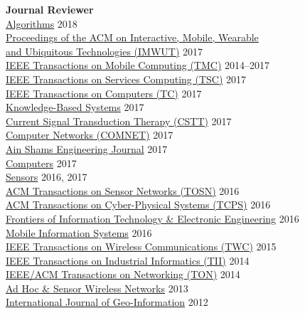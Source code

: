{\bf Journal Reviewer}\\
{\href{http://www.mdpi.com/journal/algorithms}{Algorithms}} \hfill 2018\\
{\href{https://imwut.acm.org}{Proceedings of the ACM on Interactive, Mobile, Wearable \\\mbox{\hspace{0.4cm}} and Ubiquitous Technologies (IMWUT)}} \hfill 2017\\
{\href{https://www.computer.org/portal/web/tmc}{IEEE Transactions on Mobile Computing (TMC)}} \hfill 2014--2017\\
{\href{https://www.computer.org/web/tsc}{IEEE Transactions on Services Computing (TSC)}} \hfill 2017\\
{\href{https://www.computer.org/web/tc}{IEEE Transactions on Computers (TC)}} \hfill 2017\\
{\href{https://www.journals.elsevier.com/knowledge-based-systems}{Knowledge-Based Systems}} \hfill 2017\\
{\href{http://benthamscience.com/journals/current-signal-transduction-therapy/}{Current Signal Transduction Therapy (CSTT)}} \hfill 2017\\
{\href{http://ees.elsevier.com/comnet/}{Computer Networks (COMNET)}} \hfill 2017\\
{\href{https://www.journals.elsevier.com/ain-shams-engineering-journal}{Ain Shams Engineering Journal}} \hfill 2017\\
{\href{http://www.mdpi.com/journal/computers}{Computers}} \hfill 2017\\
{\href{http://www.mdpi.com/journal/sensors}{Sensors}} \hfill 2016, 2017\\
{\href{http://tosn.acm.org/}{ACM Transactions on Sensor Networks (TOSN)}} \hfill 2016\\
{\href{http://tcps.acm.org/}{ACM Transactions on Cyber-Physical Systems (TCPS)}} \hfill 2016\\
{\href{http://www.springer.com/computer/journal/11714}{Frontiers of Information Technology \& Electronic Engineering}} \hfill 2016\\
{\href{https://www.hindawi.com/journals/misy/}{Mobile Information Systems}} \hfill 2016\\
{\href{http://www.comsoc.org/twc}{IEEE Transactions on Wireless Communications (TWC)}} \hfill 2015\\
{\href{http://www.ieee-ies.org/pubs/transactions-on-industrial-informatics}{IEEE Transactions on Industrial Informatics (TII)}} \hfill 2014\\
{\href{http://www.ifp.illinois.edu/ton}{IEEE/ACM Transactions on Networking (TON)}} \hfill 2014\\
{\href{http://www.oldcitypublishing.com/AHSWN/AHSWN.html}{Ad Hoc \& Sensor Wireless Networks}} \hfill 2013\\
{\href{http://www.mdpi.com/journal/ijgi}{International Journal of Geo-Information}} \hfill 2012\\

